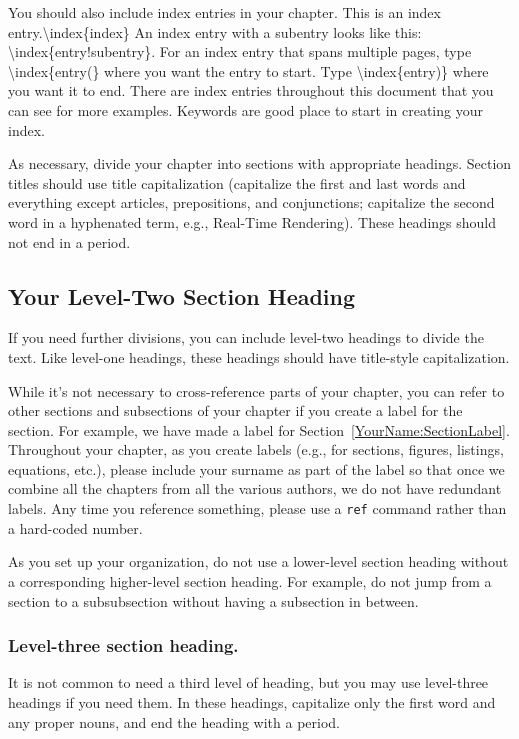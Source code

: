 You should also include index entries in your chapter. This is an index entry.\textbackslash index\{index\} An index entry with a subentry looks like this: \textbackslash index\{entry!subentry\}. For an index entry that spans multiple pages, type \textbackslash index\{entry\textbar(\} where you want the entry to start. Type \textbackslash index\{entry\textbar)\} where you want it to end. There are index entries throughout this document that you can see for more examples. Keywords are good place to start in creating your index.

As necessary, divide your chapter into sections with appropriate headings. Section titles should use title capitalization (capitalize the first and last words and everything except articles, prepositions, and conjunctions; capitalize the second word in a hyphenated term, e.g., Real-Time Rendering). These headings should not end in a period.

\subsection{Your Level-Two Section Heading}\label{YourName:SubsectionLabel}
If you need further divisions, you can include level-two headings to divide the text. Like level-one headings, these headings should have title-style capitalization.

While it's not necessary to cross-reference parts of your chapter, you can refer to other sections and subsections of your chapter if you create a label for the section. For example, we have made a label for Section~\ref{YourName:SectionLabel}. Throughout your chapter, as you create labels (e.g., for sections, figures, listings, equations, etc.), please include your surname as part of the label so that once we combine all the chapters from all the various authors, we do not have redundant labels. Any time you reference something, please use a \texttt{ref} command rather than a hard-coded number.

As you set up your organization, do not use a lower-level section heading without a corresponding higher-level section heading. For example, do not jump from a section to a subsubsection without having a subsection in between.

\subsubsection{Level-three section heading.}\label{YourName:SubsubectionLabel}
It is not common to need a third level of heading, but you may use level-three headings if you need them. In these headings, capitalize only the first word and any proper nouns, and end the heading with a period.

